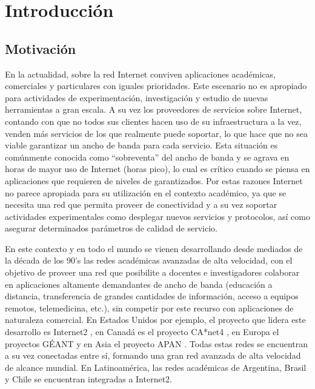 
\chapter{Introducci\'on}

\ifpdf
    \graphicspath{{Chapter1/Figs/Raster/}{Chapter1/Figs/PDF/}{Chapter2/Figs/}}
\else
    \graphicspath{{Chapter1/Figs/Vector/}{Chapter1/Figs/}}
\fi


\section{Motivación}

En la actualidad, sobre la red Internet conviven aplicaciones académicas, comerciales y particulares con iguales prioridades. Este escenario no es apropiado para actividades de experimentación, investigación y estudio de nuevas herramientas a gran escala. A su vez los proveedores de servicios sobre Internet, contando con que no todos sus clientes hacen uso de su infraestructura a la vez, venden m\'as servicios de los que realmente puede soportar, lo que hace que no sea viable garantizar un ancho de banda para cada servicio. Esta situación es comúnmente conocida como “sobreventa” del ancho de banda y se agrava en horas de mayor uso de Internet (horas pico), lo cual es crítico cuando se piensa en aplicaciones que requieren de niveles de  garantizados. Por estas razones Internet no parece apropiada para su utilización en el contexto académico, ya que se necesita una red que permita proveer de conectividad y a su vez soportar actividades experimentales como desplegar nuevos servicios y protocolos, así como asegurar determinados parámetros de calidad de servicio.

En este contexto y en todo el mundo se vienen desarrollando desde mediados de la década de los 90’s las redes académicas avanzadas de alta velocidad, con el objetivo de proveer una red que posibilite a docentes e investigadores colaborar en aplicaciones altamente demandantes de ancho de banda   
 (educación a distancia, transferencia de grandes cantidades de información, acceso a equipos remotos, telemedicina, etc.), sin competir por este recurso con aplicaciones de naturaleza comercial. En Estados Unidos por ejemplo, el proyecto que lidera este desarrollo es Internet2 \citep{Internet2}, en Canadá es el proyecto CA*net4 \citep{Canarie2}, en Europa el proyectos GÉANT \citep{GEANT} y en Asia el proyecto APAN \citep{APAN}. Todas estas redes se encuentran a su vez conectadas entre sí, formando una gran red avanzada de alta velocidad de alcance mundial. En Latinoamérica, las redes académicas de Argentina, Brasil y Chile se encuentran integradas a Internet2.

